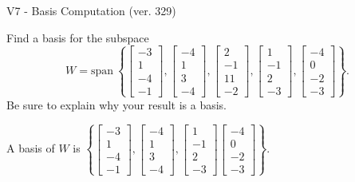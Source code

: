 \begin{exercise}
  \begin{exerciseTitle}V7 - Basis Computation (ver. 329)\end{exerciseTitle}
  \begin{exerciseStatement}
    Find a basis for the subspace 
\[W=\mathrm{span}\ \left\{\left[\begin{array}{r}
-3 \\
1 \\
-4 \\
-1
\end{array}\right] , \left[\begin{array}{r}
-4 \\
1 \\
3 \\
-4
\end{array}\right] , \left[\begin{array}{r}
2 \\
-1 \\
11 \\
-2
\end{array}\right] , \left[\begin{array}{r}
1 \\
-1 \\
2 \\
-3
\end{array}\right] , \left[\begin{array}{r}
-4 \\
0 \\
-2 \\
-3
\end{array}\right]\right\}.\]
 Be sure to explain why your result is a basis.


  \end{exerciseStatement}
  \begin{exerciseAnswer}
   A basis of \(W\) is  \(\left\{\left[\begin{array}{r}
-3 \\
1 \\
-4 \\
-1
\end{array}\right] , \left[\begin{array}{r}
-4 \\
1 \\
3 \\
-4
\end{array}\right] , \left[\begin{array}{r}
1 \\
-1 \\
2 \\
-3
\end{array}\right] \left[\begin{array}{r}
-4 \\
0 \\
-2 \\
-3
\end{array}\right]\right\}\).
  


  \end{exerciseAnswer}
\end{exercise}